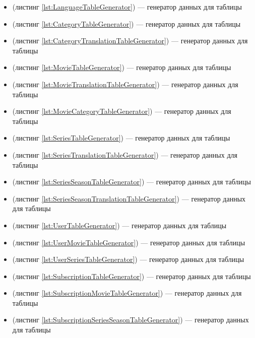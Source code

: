 \begin{enumerate}
	\begin{itemize}
		\item {} (листинг \ref{lst:LanguageTableGenerator}) --- генератор данных для таблицы 
		\item {} (листинг \ref{lst:CategoryTableGenerator})  --- генератор данных для таблицы 
		\item {} (листинг \ref{lst:CategoryTranslationTableGenerator})  --- генератор данных для таблицы 
		\item {} (листинг \ref{lst:MovieTableGenerator})  --- генератор данных для таблицы 
		\item {} (листинг \ref{lst:MovieTranslationTableGenerator})  --- генератор данных для таблицы 
		\item {} (листинг \ref{lst:MovieCategoryTableGenerator})  --- генератор данных для таблицы 
		\item {} (листинг \ref{lst:SeriesTableGenerator})  --- генератор данных для таблицы 
		\item {} (листинг \ref{lst:SeriesTranslationTableGenerator})  --- генератор данных для таблицы 
		\item {} (листинг \ref{lst:SeriesSeasonTableGenerator})  --- генератор данных для таблицы 
		\item {} (листинг \ref{lst:SeriesSeasonTranslationTableGenerator})  --- генератор данных для таблицы 
		\item {} (листинг \ref{lst:UserTableGenerator})  --- генератор данных для таблицы 
		\item {} (листинг \ref{lst:UserMovieTableGenerator})  --- генератор данных для таблицы 
		\item {} (листинг \ref{lst:UserSeriesTableGenerator})  --- генератор данных для таблицы 
		\item {} (листинг \ref{lst:SubscriptionTableGenerator})  --- генератор данных для таблицы 
		\item {} (листинг \ref{lst:SubscriptionMovieTableGenerator})  --- генератор данных для таблицы 
		\item {} (листинг \ref{lst:SubscriptionSeriesSeasonTableGenerator})  --- генератор данных для таблицы 
	\end{itemize}
	

\end{enumerate}
